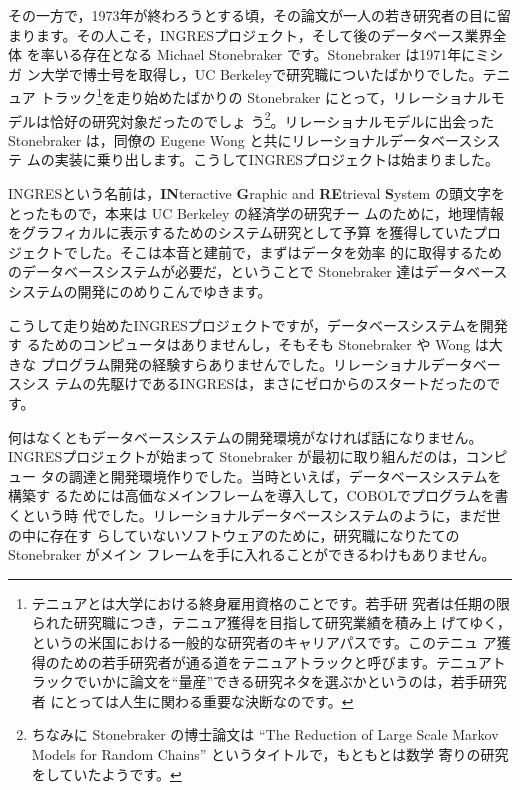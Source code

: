 その一方で，1973年が終わろうとする頃，その論文が一人の若き研究者の目に留
まります。その人こそ，INGRESプロジェクト，そして後のデータベース業界全体
を率いる存在となる Michael Stonebraker です。Stonebraker は1971年にミシガ
ン大学で博士号を取得し，UC Berkeleyで研究職についたばかりでした。テニュア
トラック\footnote{テニュアとは大学における終身雇用資格のことです。若手研
究者は任期の限られた研究職につき，テニュア獲得を目指して研究業績を積み上
げてゆく，というの米国における一般的な研究者のキャリアパスです。このテニュ
ア獲得のための若手研究者が通る道をテニュアトラックと呼びます。テニュアト
ラックでいかに論文を``量産''できる研究ネタを選ぶかというのは，若手研究者
にとっては人生に関わる重要な決断なのです。}を走り始めたばかりの
Stonebraker にとって，リレーショナルモデルは恰好の研究対象だったのでしょ
う\footnote{ちなみに Stonebraker の博士論文は ``The Reduction of Large
Scale Markov Models for Random Chains'' というタイトルで，もともとは数学
寄りの研究をしていたようです。 }。リレーショナルモデルに出会った
Stonebraker は，同僚の Eugene Wong と共にリレーショナルデータベースシステ
ムの実装に乗り出します。こうしてINGRESプロジェクトは始まりました。




INGRESという名前は，{\bf IN}teractive {\bf G}raphic and {\bf RE}trieval
{\bf S}ystem の頭文字をとったもので，本来は UC Berkeley の経済学の研究チー
ムのために，地理情報をグラフィカルに表示するためのシステム研究として予算
を獲得していたプロジェクトでした。そこは本音と建前で，まずはデータを効率
的に取得するためのデータベースシステムが必要だ，ということで Stonebraker
達はデータベースシステムの開発にのめりこんでゆきます。


こうして走り始めたINGRESプロジェクトですが，データベースシステムを開発す
るためのコンピュータはありませんし，そもそも Stonebraker や Wong は大きな
プログラム開発の経験すらありませんでした。リレーショナルデータベースシス
テムの先駆けであるINGRESは，まさにゼロからのスタートだったのです。


何はなくともデータベースシステムの開発環境がなければ話になりません。
INGRESプロジェクトが始まって Stonebraker が最初に取り組んだのは，コンピュー
タの調達と開発環境作りでした。当時といえば，データベースシステムを構築す
るためには高価なメインフレームを導入して，COBOLでプログラムを書くという時
代でした。リレーショナルデータベースシステムのように，まだ世の中に存在す
らしていないソフトウェアのために，研究職になりたての Stonebraker がメイン
フレームを手に入れることができるわけもありません。


